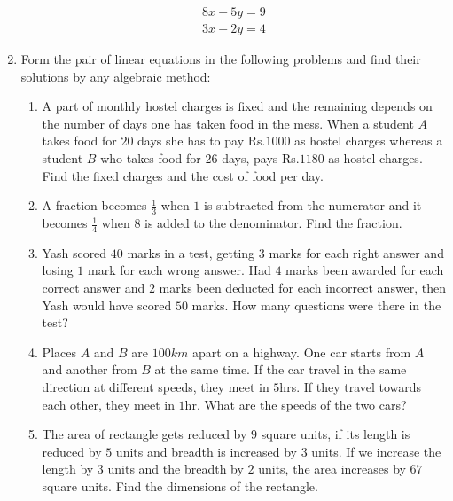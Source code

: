 \documentclass{article}
\theoremstyle{remark}
\begin{document}
\begin{enumerate}
\begin{align}
8x+5y=9
\\ 3x+2y=4
\end{align}
\item Form the pair of linear equations in the following problems and find their solutions by any algebraic method:
\begin{enumerate}[label=(\roman*)]
\item A part of monthly hostel charges is fixed and the remaining depends on the number of days one has taken food in the mess. When a student $A$ takes food for $20$ days she has to pay Rs.$1000$ as hostel charges whereas a student $B$ who takes food for $26$ days, pays Rs.$1180$ as hostel charges. Find the fixed charges and the cost of food per day.
\item A fraction becomes $\frac{1}{3}$ when $1$ is subtracted from the numerator and it becomes $\frac{1}{4}$ when $8$ is added to the denominator. Find the fraction.
\item Yash scored $40$ marks in a test, getting $3$ marks for each right answer and losing $1$ mark for each wrong answer. Had $4$ marks been awarded for each correct answer and $2$ marks been deducted for each incorrect answer, then Yash would have scored $50$ marks. How many questions were there in the test?
\item Places $A$ and $B$ are $100km$ apart on a highway. One car starts from $A$ and another from $B$ at the same time. If the car travel in the same direction at different speeds, they meet in $5$hrs. If they travel towards each other, they meet in $1$hr. What are the speeds of the two cars?
\item The area of rectangle gets reduced by $9$ square units, if its length is reduced by $5$ units and breadth is increased by $3$ units. If we increase the length by $3$ units and the breadth by $2$ units, the area increases by $67$ square units. Find the dimensions of the rectangle.
\end{enumerate}
\end{enumerate}
\end{document}

